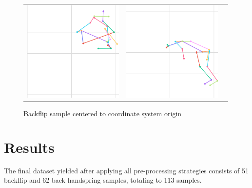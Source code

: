 \begin{figure}
\begin{tabular}{ccc}
\includegraphics[width=5cm]{images/data-preprocessing/centered-backflip-skel-part-5}&
\includegraphics[width=5cm]{images/data-preprocessing/centered-backflip-skel-part-6}\\
\end{tabular}
    \caption{Backflip sample centered to coordinate system origin}
    \label{centered-backflip-4-rasmus}
\end{figure}

\section{Results}
\label{pre-processing-results}

The final dataset yielded after applying all pre-processing strategies consists of 51 backflip and 62 back handspring samples, totaling to 113 samples. 

